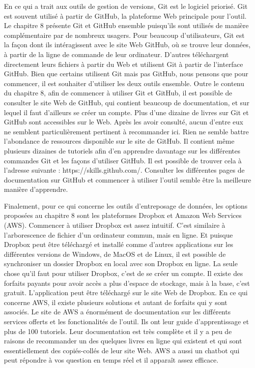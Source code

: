 \documentclass[
  letterpaper,
  DIV=11,
  numbers=noendperiod]{scrreprt}
\begin{document}
En ce qui a trait aux outils de gestion de versions, Git est le logiciel
priorisé. Git est souvent utilisé à partir de GitHub, la plateforme Web
principale pour l'outil. Le chapitre 8 présente Git et GitHub ensemble
puisqu'ils sont utilisés de manière complémentaire par de nombreux
usagers. Pour beaucoup d'utilisateurs, Git est la façon dont ils
intéragissent avec le site Web GitHub, où se trouve leur données, à
partir de la ligne de commande de leur ordinateur. D'autres téléchargent
directement leurs fichiers à partir du Web et utilisent Git à partir de
l'interface GitHub. Bien que certains utilisent Git mais pas GitHub,
nous pensons que pour commencer, il est souhaiter d'utiliser les deux
outils ensemble. Outre le contenu du chapitre 8, afin de commencer à
utiliser Git et GitHub, il est possible de consulter le site Web de
GitHub, qui contient beaucoup de documentation, et sur lequel il faut
d'ailleurs se créer un compte. Plus d'une dizaine de livres sur Git et
GitHub sont accessibles sur le Web. Après les avoir consulté, aucun
d'entre eux ne semblent particulièrement pertinent à recommander ici.
Rien ne semble battre l'abondance de ressources disponible sur le site
de GitHub. Il contient même plusieurs dizaines de tutoriels afin d'en
apprendre davantage sur les différentes commandes Git et les façons
d'utiliser GitHub. Il est possible de trouver cela à l'adresse suivante
: https://skills.github.com/. Consulter les différentes pages de
documentation sur GitHub et commencer à utiliser l'outil semble être la
meilleure manière d'apprendre.

Finalement, pour ce qui concerne les outils d'entreposage de données,
les options proposées au chapitre 8 sont les plateformes Dropbox et
Amazon Web Services (AWS). Commencer à utiliser Dropbox est assez
intuitif. C'est similaire à l'arborescence de fichier d'un ordinateur
commun, mais en ligne. Et puisque Dropbox peut être téléchargé et
installé comme d'autres applications sur les différentes versions de
Windows, de MacOS et de Linux, il est possible de synchroniser un
dossier Dropbox en local avec son Dropbox en ligne. La seule chose qu'il
faut pour utiliser Dropbox, c'est de se créer un compte. Il existe des
forfaits payants pour avoir accès a plus d'espace de stockage, mais à la
base, c'est gratuit. L'application peut être téléchargé sur le site Web
de Dropbox. En ce qui concerne AWS, il existe plusieurs solutions et
autant de forfaits qui y sont associés. Le site de AWS a énormément de
documentation sur les différents services offerts et les fonctionalités
de l'outil. Ils ont leur guide d'apprentissage et plus de 100 tutoriels.
Leur documentation est très complète et il y a peu de raisons de
recommander un des quelques livres en ligne qui existent et qui sont
essentiellement des copiés-collés de leur site Web. AWS a aussi un
chatbot qui peut répondre à vos question en temps réel et il apparaît
assez efficace.
\end{document}
